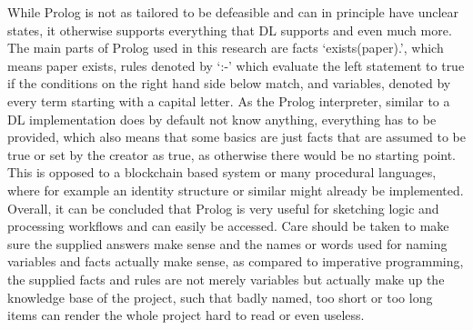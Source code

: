 \documentclass[conference]{IEEEtran}
\begin{document}
While Prolog is not as tailored to be defeasible and can in principle have unclear states, it otherwise supports everything that DL supports and even much more. \cite{morelliralphPROLOGFactsRules} %
The main parts of Prolog used in this research are facts ‘exists(paper).’, which means paper exists, rules denoted by ‘:-’ which evaluate the left statement to true if the conditions on the right hand side below match, and variables, denoted by every term starting with a capital letter. As the Prolog interpreter, similar to a DL implementation %
does by default not know anything, everything has to be provided, which also means that some basics are just facts that are assumed to be true or set by the creator as true, as otherwise there would be no starting point. This is opposed to a blockchain based system or many procedural languages, where for example an identity structure or similar might already be implemented.
Overall, it can be concluded that Prolog is very useful for sketching logic and processing workflows and can easily be accessed. Care should be taken to make sure the supplied answers make sense and the names or words used for naming variables and facts actually make sense, as compared to imperative programming, the supplied facts and rules are not merely variables but actually make up the knowledge base of the project, such that badly named, too short or too long items can render the whole project hard to read or even useless.
\end{document}
